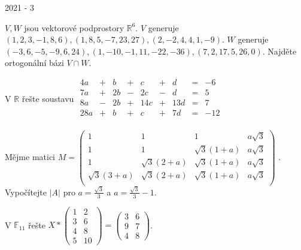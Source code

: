 
\newpage
{\large 2021 - 3}

\begin{questions}

\question \(V, W\) jsou vektorové podprostory \(\mathbb{R}^6\). \(V\) generuje \((1,2,3,-1,8,6),(1,8,5,-7,23,27),(2,-2,4,4,1,-9)\). \(W\) generuje \((-3,6,-5,-9,6,24),(1,-10,-1,11,-22,-36),(7,2,17,5,26,0)\). Najděte ortogonální bázi \(V \cap W\).

\question V \(\mathbb{R}\) řešte soustavu \(\begin{matrix}
     4a & + &  b & + &   c & + &   d & = & -6\\
     7a & + & 2b & - &  2c & - &   d & = & 5\\
     8a & - & 2b & + & 14c & + & 13d & = & 7\\
    28a & + &  b & + &   c & + &  7d & = & -12\\
\end{matrix}\)

\newpage
\question Mějme matici \(M = \begin{pmatrix}
                1 &             1 &             1 & a\sqrt{3} \\
                1 &             1 & \sqrt{3}(1+a) & a\sqrt{3} \\
                1 & \sqrt{3}(2+a) & \sqrt{3}(1+a) & a\sqrt{3} \\
    \sqrt{3}(3+a) & \sqrt{3}(2+a) & \sqrt{3}(1+a) & a\sqrt{3} \\
\end{pmatrix}\)
. Vypočítejte \(|A|\) pro \(a=\frac{\sqrt{3}}{3}\) a \(a = \frac{\sqrt{3}}{3}-1\).

\question V \(\mathbb{F}_11\) řešte \(X * \begin{pmatrix}
    1 & 2\\
    3 & 6\\
    4 & 8\\
    5 & 10
\end{pmatrix} = \begin{pmatrix}
    3 & 6\\
    9 & 7\\
    4 & 8
\end{pmatrix}\).


\end{questions}

